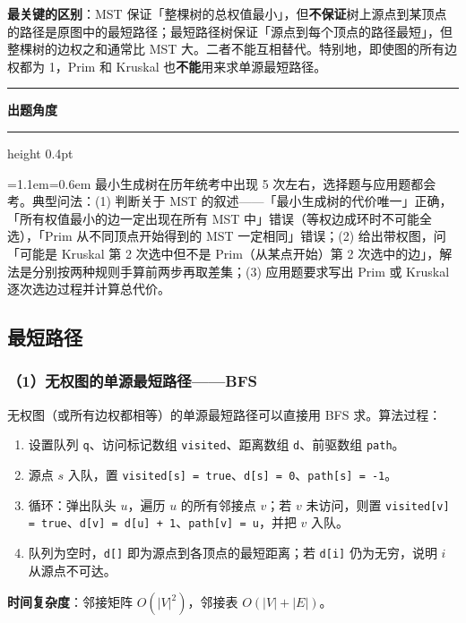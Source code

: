 \documentclass[11pt,openany,UTF8]{ctexbook}
\newcommand{\callouthead}[2]{%
  \par\addvspace{7pt}\noindent
  {\color{#1}\rule[-0.15em]{3pt}{1.05em}}\hspace{0.5em}%
  {\bfseries\color{#1}#2}\par\nobreak\vspace{-0.35em}%
  {\color{rulesep}\hrule height 0.4pt}\nobreak\vspace{0.45em}%
  \begingroup\small\setlength{\parindent}{0pt}%
  \leftskip=1.1em\rightskip=0.6em\noindent\ignorespaces}
\newcommand{\calloutend}{\par\endgroup\addvspace{7pt}}
\newenvironment{callexam}[1]{\callouthead{exambar}{#1}}{\calloutend}
\begin{document}
\textbf{最关键的区别}：MST 保证「整棵树的总权值最小」，但\textbf{不保证}树上源点到某顶点的路径是原图中的最短路径；最短路径树保证「源点到每个顶点的路径最短」，但整棵树的边权之和通常比 MST 大。二者不能互相替代。特别地，即使图的所有边权都为 1，Prim 和 Kruskal 也\textbf{不能}用来求单源最短路径。

\begin{callexam}{出题角度}
最小生成树在历年统考中出现 5 次左右，选择题与应用题都会考。典型问法：(1) 判断关于 MST 的叙述——「最小生成树的代价唯一」正确，「所有权值最小的边一定出现在所有 MST 中」错误（等权边成环时不可能全选），「Prim 从不同顶点开始得到的 MST 一定相同」错误；(2) 给出带权图，问「可能是 Kruskal 第 2 次选中但不是 Prim（从某点开始）第 2 次选中的边」，解法是分别按两种规则手算前两步再取差集；(3) 应用题要求写出 Prim 或 Kruskal 逐次选边过程并计算总代价。

\end{callexam}

\subsection{最短路径}

\subsubsection{（1）无权图的单源最短路径——BFS}

无权图（或所有边权都相等）的单源最短路径可以直接用 BFS 求。算法过程：

\begin{enumerate}
\item 设置队列 \texttt{q}、访问标记数组 \texttt{visited}、距离数组 \texttt{d}、前驱数组 \texttt{path}。
\item 源点 $s$ 入队，置 \texttt{visited[s]\allowbreak{} =\allowbreak{} true}、\texttt{d[s]\allowbreak{} =\allowbreak{} 0}、\texttt{path[s]\allowbreak{} =\allowbreak{} -1}。
\item 循环：弹出队头 $u$，遍历 $u$ 的所有邻接点 $v$；若 $v$ 未访问，则置 \texttt{visited[v]\allowbreak{} =\allowbreak{} true}、\texttt{d[v]\allowbreak{} =\allowbreak{} d[u]\allowbreak{} +\allowbreak{} 1}、\texttt{path[v]\allowbreak{} =\allowbreak{} u}，并把 $v$ 入队。
\item 队列为空时，\texttt{d[]\allowbreak{}} 即为源点到各顶点的最短距离；若 \texttt{d[i]\allowbreak{}} 仍为无穷，说明 $i$ 从源点不可达。
\end{enumerate}
\textbf{时间复杂度}：邻接矩阵 $O(|V|^{2})$，邻接表 $O(|V|+|E|)$。
\end{document}
